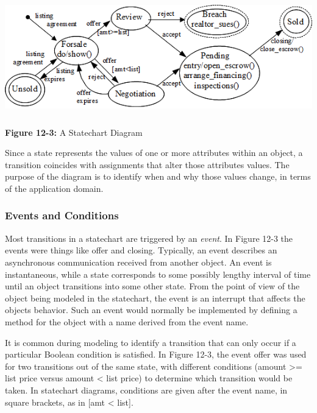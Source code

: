 \bigskip

\includegraphics[width=5.8in,height=2.0in]{ub-img/statechart.png}

{\sffamily\bfseries Figure 12-3:}
{\sffamily A Statechart Diagram}

\bigskip

Since a state represents the values of one or more attributes within an
object, a transition coincides with assignments that alter those
attributes{\textquotesingle} values. The purpose of the diagram is to
identify when and why those values change, in terms of the application
domain.

\subsubsection{Events and Conditions}
Most transitions in a statechart are triggered by an \textit{event}. In Figure 12-3 the events were things like
{\textquotedbl}offer{\textquotedbl} and
{\textquotedbl}closing.{\textquotedbl} Typically, an event describes an
asynchronous communication received from another object. An event is
instantaneous, while a state corresponds to some possibly lengthy
interval of time until an object transitions into some other state.
From the point of view of the object being modeled in the statechart,
the event is an interrupt that affects the object{\textquotesingle}s
behavior. Such an event would normally be implemented by defining a
method for the object with a name derived from the event name.

It is common during modeling to identify a transition that can only
occur if a particular Boolean condition is satisfied. In Figure 12-3,
the event offer was used for two transitions out of the same state,
with different conditions (amount {\textgreater}= list price versus
amount {\textless} list price) to determine which transition would be
taken. In statechart diagrams, conditions are given after the event
name, in square brackets, as in \textsf{[amt {\textless} list]}.

